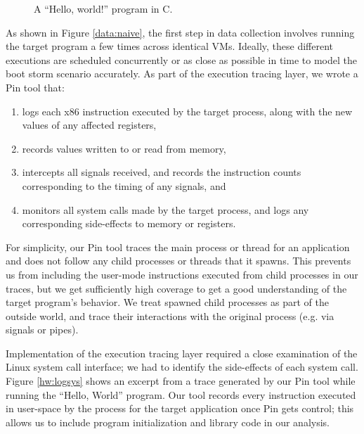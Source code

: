 \begin{figure}[h]
  
  \caption[A ``Hello, world!'' program in C.]%
          {A ``Hello, world!'' program in C. }
          \label{source:hw}
\end{figure}

 \newline
As shown in Figure \ref{data:naive}, the first step
in data collection involves running the target program
a few times across identical VMs. Ideally, these 
different executions are scheduled concurrently or as
close as possible in time to model the boot storm scenario accurately. 
As part of the execution tracing layer, we wrote a Pin tool that:
\begin{enumerate}
\item logs each x86 instruction executed by 
  the target process, along with the 
  new values of any affected registers, 
\item records values written to or 
  read from memory,
\item intercepts all signals received, and records the instruction counts 
  corresponding to the timing of any signals, and
\item monitors all system calls made by the target process,
  and logs any corresponding side-effects to memory or registers.
\end{enumerate}
For simplicity, our Pin tool traces the main process or thread 
for an application and does not follow any child processes or threads 
that it spawns. This prevents
us from including the user-mode instructions executed from child processes in our traces, 
but we get sufficiently high coverage to get a good understanding 
of the target program's behavior. We treat spawned child processes as part of the outside
world, and trace their interactions with the original process
(e.g. via signals or pipes).

Implementation of the execution tracing layer required
a close examination of the Linux system call interface;
we had to identify the side-effects of each system call. 
Figure \ref{hw:logsys} shows an excerpt from a trace 
generated by our Pin tool while running the ``Hello, World'' 
program. Our tool records 
every instruction executed in user-space by the process
for the target application once Pin gets control; 
this allows us to include program initialization
and library code in our analysis. \newline

